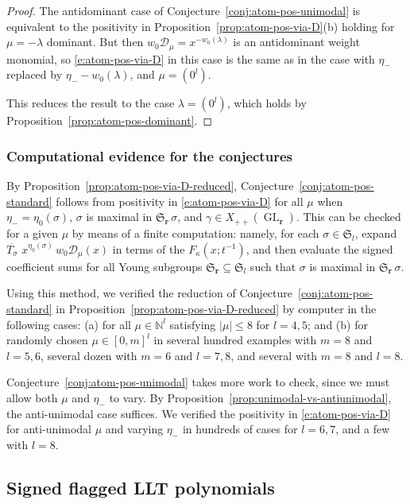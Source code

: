 \documentclass[12pt]{amsart}
\theoremstyle{definition}
\theoremstyle{remark}
\newcommand{\NN}{{\mathbb N}}
\newcommand{\rr}{{\mathbf r}}
\newcommand{\Sfrak}{{\mathfrak S}}
\newcommand{\Dcal}{{\mathcal D}}
\DeclareMathOperator{\GL}{GL}
\begin{document}
\begin{proof}
The antidominant case of Conjecture~\ref{conj:atom-pos-unimodal} is
equivalent to the positivity in
Proposition~\ref{prop:atom-pos-via-D}(b) holding for $\mu = -\lambda $
dominant.  But then $w_{0}\Dcal _{\mu } = x^{-w_{0}(\lambda )}$ is an
antidominant weight monomial, so \eqref{e:atom-pos-via-D} in this case
is the same as in the case with $\eta _{-}$ replaced by $\eta
_{-}-w_{0}(\lambda )$, and $\mu =(0^{l})$.

This reduces the result to the case $\lambda =(0^{l})$, which holds by
Proposition~\ref{prop:atom-pos-dominant}.
\end{proof}

\subsubsection*{Computational evidence for the conjectures}

By Proposition~\ref{prop:atom-pos-via-D-reduced},
Conjecture~\ref{conj:atom-pos-standard} follows from positivity in
\eqref{e:atom-pos-via-D} for all $\mu $ when $\eta _{-} = \eta
_{0}(\sigma )$, $\sigma $ is maximal in $\Sfrak _{\rr }\, \sigma $,
and $\gamma \in X_{++}(\GL _{\rr})$.  This can be checked for a given
$\mu $ by means of a finite computation: namely, for each $\sigma \in
\Sfrak _{l}$, expand $\overline{T_{\sigma }}\, \, x^{\eta _{0}(\sigma
)}\, w_{0} \Dcal _{\mu }(x)$ in terms of the $F_{\kappa }(x;t^{-1})$,
and then evaluate the signed coefficient sums for all Young subgroups
$\Sfrak _{\rr} \subseteq \Sfrak _{l}$ such that $\sigma $ is maximal
in $\Sfrak _{\rr }\, \sigma $.

Using this method, we verified the reduction of
Conjecture~\ref{conj:atom-pos-standard} in
Proposition~\ref{prop:atom-pos-via-D-reduced} by computer in the
following cases: (a) for all $\mu \in \NN ^{l}$ satisfying $|\mu |\leq
8$ for $l=4,5$; and (b) for randomly chosen $\mu \in [0,m]^{l}$ in
several hundred examples with $m=8$ and $l = 5,6$, several dozen with
$m=6$ and $l=7,8$, and several with $m=8$ and $l=8$.

Conjecture~\ref{conj:atom-pos-unimodal} takes more work to check,
since we must allow both $\mu $ and $\eta _{-}$ to vary.  By
Proposition~\ref{prop:unimodal-vs-antiunimodal}, the anti-unimodal
case suffices.  We verified the positivity in \eqref{e:atom-pos-via-D}
for anti-unimodal $\mu $ and varying $\eta _{-}$ in hundreds of cases
for $l=6,7$, and a few with $l=8$.


\subsection{Signed flagged LLT polynomials}
\label{ss:signed}
\end{document}
